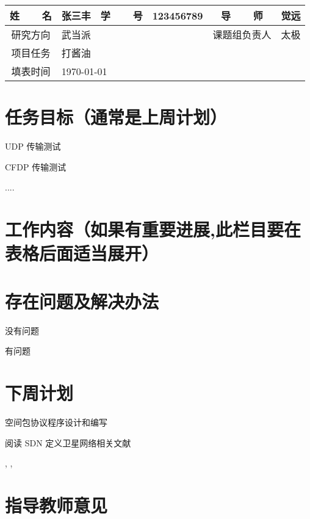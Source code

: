 \documentclass[a4paper,11pt]{article}
\let\oldenum\enumerate
\let\oldendenum\endenumerate
\renewenvironment{enumerate}
{\oldenum\setlength{\parskip}{\smallskipamount} \itemsep=-2pt}
{\oldendenum}
\begin{document}
\def\name{张三丰}
\def\studentid{123456789}
\def\mentor{觉远}
\def\leader{太极}
\def\direction{武当派}

\renewcommand{\arraystretch}{1.5}
\begin{center}
\begin{tabularx}{\textwidth}{c|c|c|c|c|X} 
    姓~~~~名 & \name & 学~~~~号 & \studentid & 导~~~~师  & \mentor \\\hline
    研究方向 & \multicolumn{3}{l|}{\direction} & 课题组负责人 &
        \leader \\\hline
    项目任务 & \multicolumn{5}{l}{打酱油} \\\hline
    填表时间 & \multicolumn{5}{l}{\today}\\\hline
\end{tabularx}
\end{center}

\section{任务目标（通常是上周计划）}
\begin{enumerate}
    \item UDP 传输测试
    \item CFDP 传输测试
    \item ....
\end{enumerate}

\section{工作内容（如果有重要进展,此栏目要在表格后面适当展开）}
\lipsum[2-3]

\section{存在问题及解决办法}
\lipsum[9]
\begin{enumerate}
    \item 没有问题
    \item 有问题
\end{enumerate}

\section{下周计划}
\begin{enumerate}
    \item 空间包协议程序设计和编写
    \item 阅读 SDN 定义卫星网络相关文献
\end{enumerate}

\lipsum[7]  

\begin{thebibliography}{9}
    ,
    ,
\end{thebibliography}

\vfill
\section{指导教师意见}

\vskip 2cm
\end{document}
